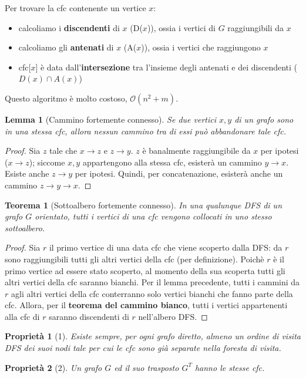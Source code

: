 \documentclass[11pt]{article}
\newtheorem*{theorem}{Teorema}
\newtheorem*{proprietà}{Proprietà}
\newtheorem*{lemma}{Lemma}
\theoremstyle{proprietà}
\begin{document}
Per trovare la cfc contenente un vertice $x$:
\begin{itemize}
    \item calcoliamo i \textbf{discendenti} di $x$ (D($x$)), ossia i vertici di $G$ raggiungibili da $x$
    \item calcoliamo gli \textbf{antenati} di $x$ (A($x$)), ossia i vertici che raggiungono $x$
    \item cfc[$x$] è data dall'\textbf{intersezione} tra l'insieme degli antenati e dei discendenti ($D(x)\cap A(x)$)
\end{itemize}
Questo algoritmo è molto costoso, $\mathcal{O}(n^2+m)$.
\begin{lemma}[Cammino fortemente connesso]
    Se due vertici $x,y$ di un grafo sono in una stessa cfc, allora nessun cammino tra di essi può abbandonare tale cfc.
\end{lemma}
\begin{proof}
    Sia $z$ tale che $x\rightarrow z$ e $z\rightarrow y$. $z$ è banalmente raggiungibile da $x$ per ipotesi ($x\rightarrow z$); 
    siccome $x,y$ appartengono alla stessa cfc, esisterà un cammino $y\rightarrow x$. Esiste anche $z\rightarrow y$ per 
    ipotesi. Quindi, per concatenazione, esisterà anche un cammino $z\rightarrow y\rightarrow x$.
\end{proof}
\begin{theorem}[Sottoalbero fortemente connesso]
    In una qualunque DFS di un grafo $G$ orientato, tutti i vertici di una cfc vengono collocati in uno stesso sottoalbero.
\end{theorem}
\begin{proof}
    Sia $r$ il primo vertice di una data cfc che viene scoperto dalla DFS: da $r$ sono raggiungibili tutti gli altri vertici 
    della cfc (per definizione). Poichè $r$ è il primo vertice ad essere stato scoperto, al momento della sua scoperta tutti 
    gli altri vertici della cfc saranno bianchi. Per il lemma precedente, tutti i cammini da $r$ agli altri vertici della 
    cfc conterranno solo vertici bianchi che fanno parte della cfc. Allora, per il \textbf{teorema del cammino bianco}, 
    tutti i vertici appartenenti alla cfc di $r$ saranno discendenti di $r$ nell'albero DFS.
\end{proof}
\begin{proprietà}[1]
    Esiste sempre, per ogni grafo diretto, almeno un ordine di visita DFS dei suoi nodi tale per cui le cfc sono già 
    separate nella foresta di visita.
\end{proprietà}
\begin{proprietà}[2]
    Un grafo $G$ ed il suo trasposto $G^T$ hanno le stesse cfc.
\end{proprietà}
\end{document}
